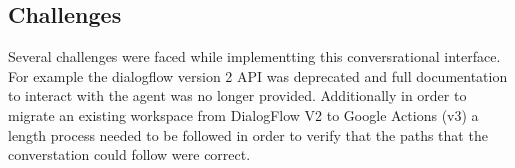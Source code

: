 \documentclass[9pt,software]{livecoms}
\begin{document}
\subsection{Challenges}
Several challenges were faced while implementting this conversrational interface. For example the dialogflow version 2 API was deprecated and full documentation to interact with the agent was no longer provided. Additionally in order to migrate
an existing workspace from DialogFlow V2 to Google Actions (v3) a length process needed to be followed in order to verify that the paths that the converstation could follow were correct. 



\end{document}
